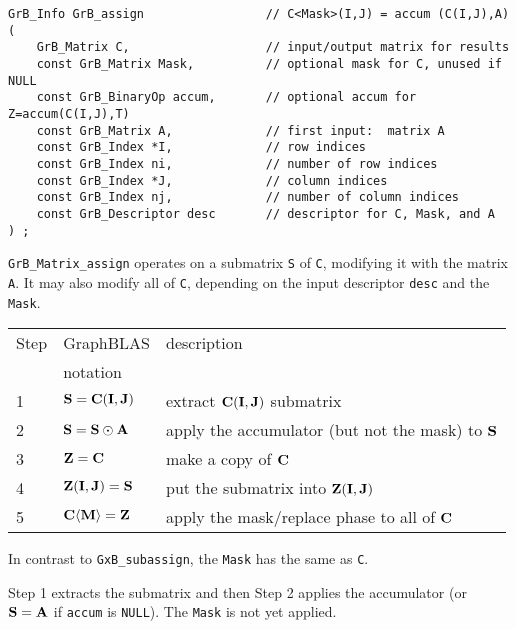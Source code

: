 \documentclass[12pt]{article}
\begin{document}
\begin{mdframed}[userdefinedwidth=6in]
{\footnotesize
\begin{verbatim}
GrB_Info GrB_assign                 // C<Mask>(I,J) = accum (C(I,J),A)
(
    GrB_Matrix C,                   // input/output matrix for results
    const GrB_Matrix Mask,          // optional mask for C, unused if NULL
    const GrB_BinaryOp accum,       // optional accum for Z=accum(C(I,J),T)
    const GrB_Matrix A,             // first input:  matrix A
    const GrB_Index *I,             // row indices
    const GrB_Index ni,             // number of row indices
    const GrB_Index *J,             // column indices
    const GrB_Index nj,             // number of column indices
    const GrB_Descriptor desc       // descriptor for C, Mask, and A
) ;
\end{verbatim} } \end{mdframed}

\verb'GrB_Matrix_assign' operates on a submatrix \verb'S' of \verb'C',
modifying it with the matrix \verb'A'.  It may also modify all of \verb'C',
depending on the input descriptor \verb'desc' and the \verb'Mask'.

\vspace{0.1in}
\begin{tabular}{lll}
\hline
Step & GraphBLAS & description \\
     & notation  & \\
\hline
1 & ${\bf S} = {\bf C(I,J)}$                & extract ${\bf C(I,J)}$ submatrix \\
2 & ${\bf S} = {\bf S} \odot {\bf A}$       & apply the accumulator (but not the mask) to ${\bf S}$\\
3 & ${\bf Z} = {\bf C}$                     & make a copy of ${\bf C}$ \\
4 & ${\bf Z(I,J)} = {\bf S}$                & put the submatrix into ${\bf Z(I,J)}$ \\
5 & ${\bf C \langle M \rangle = Z}$         & apply the mask/replace phase to all of ${\bf C}$ \\
\hline
\end{tabular}
\vspace{0.1in}

In contrast to \verb'GxB_subassign', the \verb'Mask' has the same as \verb'C'.

Step 1 extracts the submatrix and then Step 2 applies the accumulator
(or ${\bf S}={\bf A}$ if \verb'accum' is \verb'NULL').  The \verb'Mask' is
not yet applied.
\end{document}
